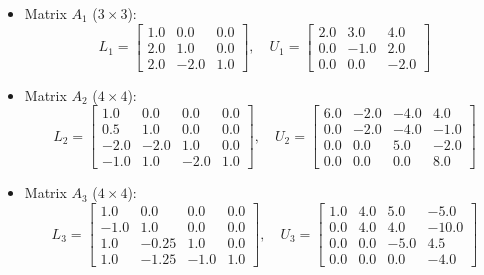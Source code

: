 \begin{solution}
	\begin{itemize}
		\item Matrix $A_1$ ($3\times3$):
		      \[
			      L_1 = \begin{bmatrix}
				      1.0 & 0.0  & 0.0 \\
				      2.0 & 1.0  & 0.0 \\
				      2.0 & -2.0 & 1.0
			      \end{bmatrix}, \quad
			      U_1 = \begin{bmatrix}
				      2.0 & 3.0  & 4.0  \\
				      0.0 & -1.0 & 2.0  \\
				      0.0 & 0.0  & -2.0
			      \end{bmatrix}
		      \]
		\item Matrix $A_2$ ($4\times4$):
		      \[
			      L_2 = \begin{bmatrix}
				      1.0  & 0.0  & 0.0  & 0.0 \\
				      0.5  & 1.0  & 0.0  & 0.0 \\
				      -2.0 & -2.0 & 1.0  & 0.0 \\
				      -1.0 & 1.0  & -2.0 & 1.0
			      \end{bmatrix}, \quad
			      U_2 = \begin{bmatrix}
				      6.0 & -2.0 & -4.0 & 4.0  \\
				      0.0 & -2.0 & -4.0 & -1.0 \\
				      0.0 & 0.0  & 5.0  & -2.0 \\
				      0.0 & 0.0  & 0.0  & 8.0
			      \end{bmatrix}
		      \]
		\item Matrix $A_3$ ($4\times4$):
		      \[
			      L_3 = \begin{bmatrix}
				      1.0  & 0.0   & 0.0  & 0.0 \\
				      -1.0 & 1.0   & 0.0  & 0.0 \\
				      1.0  & -0.25 & 1.0  & 0.0 \\
				      1.0  & -1.25 & -1.0 & 1.0
			      \end{bmatrix}, \quad
			      U_3 = \begin{bmatrix}
				      1.0 & 4.0 & 5.0  & -5.0  \\
				      0.0 & 4.0 & 4.0  & -10.0 \\
				      0.0 & 0.0 & -5.0 & 4.5   \\
				      0.0 & 0.0 & 0.0  & -4.0
			      \end{bmatrix}
		      \]
	\end{itemize}


\end{solution}
